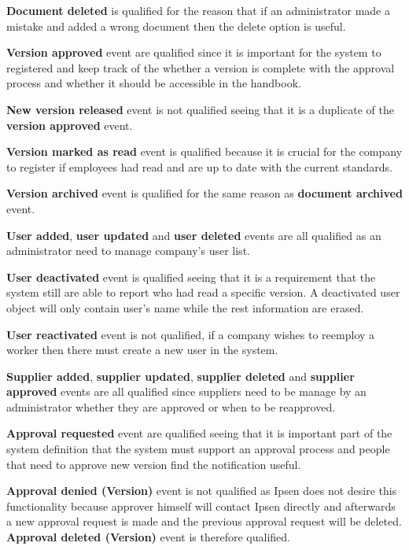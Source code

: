 \textbf{Document deleted} is qualified for the reason that if an administrator made a mistake and added a wrong document then the delete option is useful. 

\textbf{Version approved} event are qualified since it is important for the system to registered and keep track of the whether a version is complete with the approval process and whether it should be accessible in the handbook. 

\textbf{New version released} event is not qualified seeing that it is a duplicate of the \textbf{version approved} event. 

\textbf{Version marked as read} event is qualified because it is crucial for the company to register if employees had read and are up to date with the current standards. 

\textbf{Version archived} event is qualified for the same reason as \textbf{document archived} event.

\textbf{User added}, \textbf{user updated} and \textbf{user deleted} events are all qualified as an administrator need to manage company's user list. 

\textbf{User deactivated} event is qualified seeing that it is a requirement that the system still are able to report who had read a specific version. A deactivated user object will only contain user's name while the rest information are erased. 

\textbf{User reactivated} event is not qualified, if a company wishes to reemploy a worker then there must create a new user in the system. 


\textbf{Supplier added}, \textbf{supplier updated},  \textbf{supplier deleted} and \textbf{supplier approved} events are all qualified since suppliers need to be manage by an administrator whether they are approved or when to be reapproved. 

\textbf{Approval requested} event are qualified seeing that it is important part of the system definition that the system must support an approval process and people that need to approve new version find the notification useful. 

 \textbf{Approval denied (Version)} event is not qualified as Ipsen does not desire this functionality because approver himself will contact Ipsen directly and afterwards a new approval request is made and the previous approval request will be deleted. \textbf{Approval deleted (Version)} event is therefore qualified.


